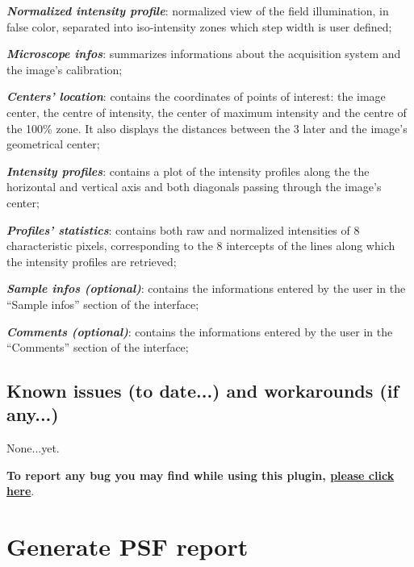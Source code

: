 \documentclass[a4paper, 11pt]{report}%
\makeatletter
\newcommand{\mailbug}{\begin{center}\textbf{To report any bug you may find while using this plugin, \href{mailto:fabrice.cordelieres@gmail.com,cedric.matthews@ibdml.univ-mrs.fr ?subject=Bug\%20found\%20in\%20MetroloJ&body=\%0ABug\%20description:\%0A\%0AHow\%20did\%20it\%20happen:\%0A\%0ACopy/Paste\%20the\%20content\%20of\%20the\%20log\%20window\%0A\%0AVersion\%20of\%20ImageJ:\%0A\%0AVersion\%20of\%20Java:}{please click here}}.\end{center}}
\makeatother
\begin{document}
\begin{itemize*}
	\item \textbf{\textit{Normalized intensity profile}}: normalized view of the field illumination, in false color, separated into iso-intensity zones which step width is user defined;
	\item \textbf{\textit{Microscope infos}}: summarizes informations about the acquisition system and the image's calibration;
	\item \textbf{\textit{Centers' location}}: contains the coordinates of points of interest: the image center, the centre of intensity, the center of maximum intensity and the centre of the 100\% zone. It also displays the distances between the 3 later and the image's geometrical center;
	\item \textbf{\textit{Intensity profiles}}: contains a plot of the intensity profiles along the the horizontal and vertical axis and both diagonals passing through the image's center;
	\item \textbf{\textit{Profiles' statistics}}: contains both raw and normalized intensities of 8 characteristic pixels, corresponding to the 8 intercepts of the lines along which the intensity profiles are retrieved;
	\item \textbf{\textit{Sample infos (optional)}}: contains the informations entered by the user in the ``Sample infos'' section of the interface;
	\item \textbf{\textit{Comments (optional)}}: contains the informations entered by the user in the ``Comments'' section of the interface;
\end{itemize*}

\section{Known issues (to date...) and workarounds (if any...)}
\label{sec:gfir-ki}

None...yet.

\mailbug

\chapter{Generate PSF report}
\label{chap:gpr}

\end{document}
